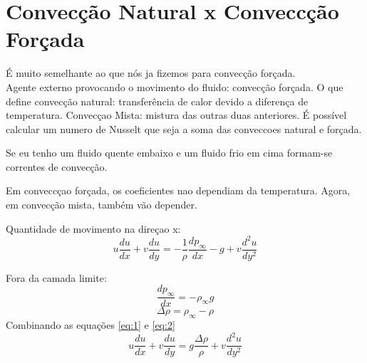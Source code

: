 \section{Convecção Natural x Conveccção Forçada}
É muito semelhante ao que nós ja fizemos para convecção forçada.\\
Agente externo provocando o movimento do fluido: convecção forçada.
O que define convecção natural: transferência de calor devido a diferença
de temperatura.
Convecçao Mista: mistura das outras duas anteriores.
É possível calcular um numero de Nusselt que seja a soma das conveccoes 
natural e forçada.



Se eu tenho um fluido quente embaixo e um fluido frio em cima formam-se correntes de convecção.

Em conveccçao forçada, os coeficientes nao dependiam da temperatura.
Agora, em convecção mista, também vão depender.



Quantidade de movimento na direçao x:
\begin{equation}
u\frac{du}{dx}+v\frac{du}{dy}=-\frac{1}{\rho}\frac{dp_{\infty}}{dx}-g+v\frac{d^{2}u}{dy^{2}}
\label{eq:1}
\end{equation}

Fora da camada limite:
\begin{equation}
\frac{dp_{\infty}}{dx}=-\rho_{\infty}g
\label{eq:2}
\end{equation}
\[\Delta \rho = \rho _{\infty}-\rho\]
Combinando as equações \ref{eq:1} e \ref{eq:2}
\begin{equation}
u\frac{du}{dx}+v\frac{du}{dy}=g\frac{\Delta \rho}{\rho}+v\frac{d^{2}u}{dy^{2}}
\label{eq:3}
\end{equation}


